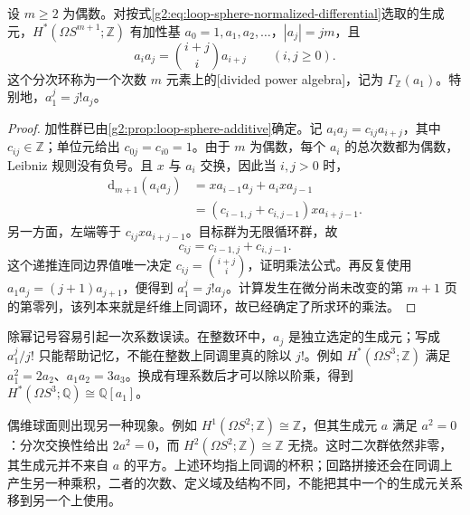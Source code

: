 \begin{theorem}\label{g2:thm:odd-sphere-loop-ring}
	设 \(m\ge2\) 为偶数。对按式\eqref{g2:eq:loop-sphere-normalized-differential}选取的生成元，\(H^*(\Omega S^{m+1};\mathbb Z)\) 有加性基 \(a_0=1,a_1,a_2,\ldots\)，\(|a_j|=jm\)，且
	\begin{equation}\label{g2:eq:loop-sphere-divided-powers}
		a_i a_j=\binom{i+j}{i}a_{i+j}\qquad(i,j\ge0).
	\end{equation}
	这个分次环称为一个次数 \(m\) 元素上的[divided power algebra]，记为 \(\Gamma_{\mathbb Z}(a_1)\)。特别地，\(a_1^j=j!a_j\)。
\end{theorem}
\begin{proof}
	加性群已由\cref{g2:prop:loop-sphere-additive}确定。记 \(a_i a_j=c_{ij}a_{i+j}\)，其中 \(c_{ij}\in\mathbb Z\)；单位元给出 \(c_{0j}=c_{i0}=1\)。由于 \(m\) 为偶数，每个 \(a_i\) 的总次数都为偶数，Leibniz 规则没有负号。且 \(x\) 与 \(a_i\) 交换，因此当 \(i,j>0\) 时，
	\[
		\begin{aligned}
			\mathrm d_{m+1}(a_i a_j)
			&=x a_{i-1}a_j+a_i x a_{j-1}\\
			&=(c_{i-1,j}+c_{i,j-1})x a_{i+j-1}.
		\end{aligned}
	\]
	另一方面，左端等于 \(c_{ij}x a_{i+j-1}\)。目标群为无限循环群，故
	\[
		c_{ij}=c_{i-1,j}+c_{i,j-1}.
	\]
	这个递推连同边界值唯一决定 \(c_{ij}=\binom{i+j}{i}\)，证明乘法公式。再反复使用 \(a_1a_j=(j+1)a_{j+1}\)，便得到 \(a_1^j=j!a_j\)。计算发生在微分尚未改变的第 \(m+1\) 页的第零列，该列本来就是纤维上同调环，故已经确定了所求环的乘法。
\end{proof}

除幂记号容易引起一次系数误读。在整数环中，\(a_j\) 是独立选定的生成元；写成 \(a_1^j/j!\) 只能帮助记忆，不能在整数上同调里真的除以 \(j!\)。例如 \(H^*(\Omega S^3;\mathbb Z)\) 满足 \(a_1^2=2a_2\)、\(a_1a_2=3a_3\)。换成有理系数后才可以除以阶乘，得到 \(H^*(\Omega S^3;\mathbb Q)\cong\mathbb Q[a_1]\)。

\ProseParagraphBreak

偶维球面则出现另一种现象。例如 \(H^1(\Omega S^2;\mathbb Z)\cong\mathbb Z\)，但其生成元 \(a\) 满足 \(a^2=0\)：分次交换性给出 \(2a^2=0\)，而 \(H^2(\Omega S^2;\mathbb Z)\cong\mathbb Z\) 无挠。这时二次群依然非零，其生成元并不来自 \(a\) 的平方。上述环均指上同调的杯积；回路拼接还会在同调上产生另一种乘积，二者的次数、定义域及结构不同，不能把其中一个的生成元关系移到另一个上使用。

